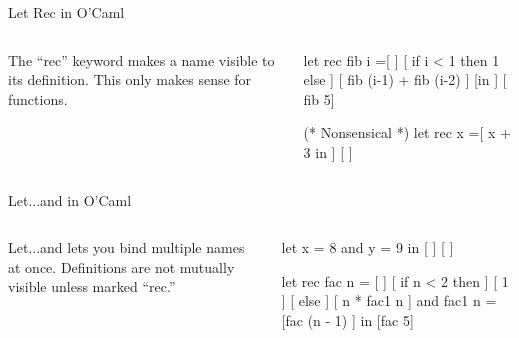 \documentclass{plt}
\begin{document}
\begin{frame}[fragile]{Let Rec in O'Caml}
  \begin{columns}
    \begin{column}{0.5\textwidth}
The ``rec'' keyword makes a name visible to its definition.  This only
makes sense for functions.
    \end{column}
    \begin{column}{0.5\textwidth}
\begin{showscope}
let rec fib i =[           ]
[  if i < 1 then 1 else    ]
[    fib (i-1) + fib (i-2) ]
[in                        ]
[  fib 5]%
\end{showscope}

\begin{showscope}
(* Nonsensical *)
let rec x =[ x + 3 in      ]
[                          ]
\end{showscope}
    \end{column}
  \end{columns}
\end{frame}

\begin{frame}[fragile]{Let...and in O'Caml}

  \begin{columns}
    \begin{column}{0.5\textwidth}
Let...and lets you bind multiple names at once.  Definitions are not
mutually visible unless marked ``rec.''
    \end{column}
    \begin{column}{0.5\textwidth}
\begin{showscope}
let x = 8
and y = 9 in
[                          ]
[                          ]
\end{showscope}
\begin{showscope}
let rec fac n = [          ]
[     if n < 2 then        ]
[       1                  ]
[     else                 ]
[       n * fac1 n         ]
and fac1 n = [fac (n - 1)  ]
in
[fac 5]%
\end{showscope}
    \end{column}
  \end{columns}
\end{frame}
\end{document}
